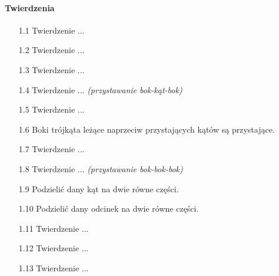 \paragraph{Twierdzenia}	
\begin{enumerate}	
    \item [1.1] Twierdzenie ... %
    \item [1.2] Twierdzenie ... %
    \item [1.3] Twierdzenie ... %
    \item [1.4] Twierdzenie ... \hfill \emph{(przystawanie bok-kąt-bok)} %
    \item [1.5] Twierdzenie ... %
    \item [1.6] Boki trójkąta leżące naprzeciw przystających kątów są przystające.
    \item [1.7] Twierdzenie ... %
    \item [1.8] Twierdzenie ... \hfill \emph{(przystawanie bok-bok-bok)} %
    \item [1.9] Podzielić dany kąt na dwie równe części.
    \item [1.10] Podzielić dany odcinek na dwie równe części.
    \item [1.11] Twierdzenie ... %
    \item [1.12] Twierdzenie ... %
    \item [1.13] Twierdzenie ... %

\end{enumerate}
